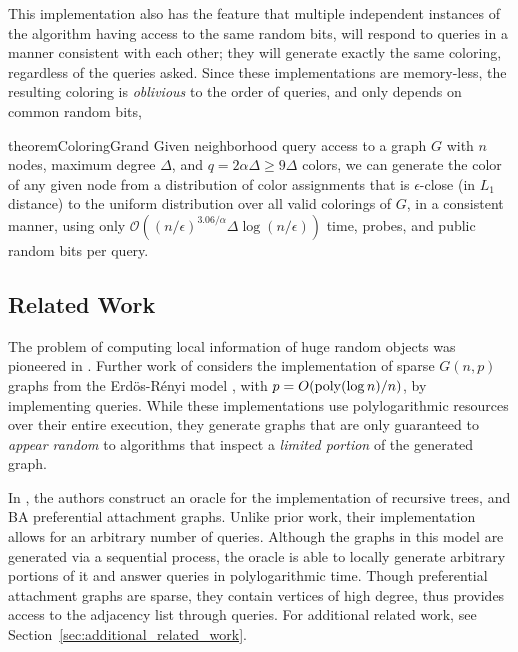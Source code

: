 This implementation also has the feature that multiple independent instances of the algorithm having access to the same random bits,
will respond to queries in a manner consistent with each other; they will generate exactly the same coloring, regardless of the queries asked.
Since these implementations are memory-less, the resulting coloring is \emph{oblivious} to the order of queries,
and only depends on common random bits,

\begin{restatable}{theorem}{ColoringGrand}
\label{thm:coloring_grand}
Given neighborhood query access to a graph $G$ with $n$ nodes, maximum degree $\Delta$, and $q=2\alpha\Delta \ge 9\Delta$ colors,
we can generate the color of any given node from a distribution of color assignments that is $\epsilon$-close (in $L_1$ distance)
to the uniform distribution over all valid colorings of $G$, in a consistent manner,
using only $\mathcal O((n/\epsilon)^{3.06/\alpha}\Delta\log (n/\epsilon))$ time, probes, and public random bits per query.
\end{restatable}




\subsection{Related Work}
\label{sec:related_work}
The problem of computing local information of huge random objects was pioneered in \cite{huge_old,huge}.
Further work of \cite{sparse} considers the implementation of sparse $G(n,p)$ graphs from the Erd\"{o}s-R\'{e}nyi model \cite{er},
with $p = O(\mathrm{poly}(\log n)/n)$, by implementing  queries.
While these implementations use polylogarithmic resources over their entire execution,
they generate graphs that are only guaranteed to \emph{appear random} to algorithms that inspect a \emph{limited portion} of the generated graph.

In \cite{reut}, the authors construct an oracle for the implementation of recursive trees, and BA preferential attachment graphs.
Unlike prior work, their implementation allows for an arbitrary number of queries.
Although the graphs in this model are generated via a sequential process,
the oracle is able to locally generate arbitrary portions of it and answer queries in polylogarithmic time.
Though preferential attachment graphs are sparse, they contain vertices of high degree,
thus \cite{reut} provides access to the adjacency list through  queries.
For additional related work, see Section~\ref{sec:additional_related_work}.



